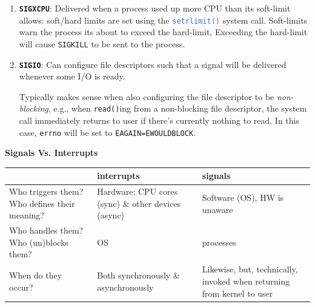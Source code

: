 \documentclass[openany,12pt]{book}
\newcommand{\code}[1]{\texttt{#1}}
\newcommand{\blue}[1]{\textcolor{RoyalBlue}{#1}}
\begin{document}
\begin{enumerate}
    \item \textbf{\code{SIGXCPU}}: Delivered when a process used up more CPU than its soft-limit allows: soft/hard limits are set using the \blue{\code{setrlimit()}} system call. Soft-limits warn the process its about to exceed the hard-limit, Exceeding the hard-limit will cause \code{SIGKILL} to be sent to the process.

    \item \textbf{\code{SIGIO}}: Can configure file descriptors such that a signal will be delivered whenever some I/O is ready.

          Typically makes sense when also configuring the file descriptor to be \textit{non-blocking}, e.g., when \code{read()}ing from a non-blocking file descriptor, the system call immediately returns to user if there's currently nothing to read. In this case, \code{errno} will be set to \code{EAGAIN=EWOULDBLOCK}.
\end{enumerate}


\begin{samepage}
    \begin{center}
        \textbf{Signals Vs. Interrupts}
        \begin{tabular}{|>{\raggedright\arraybackslash}p{4.5cm}|>{\raggedright\arraybackslash}p{5.5cm}|>{\raggedright\arraybackslash}p{5.5cm}|}
            \hline
            \rowcolor{blue!30}
             & \textbf{interrupts}                                                                      & \textbf{signals} \\
            \hline
            Who triggers them? \newline Who defines their meaning?
             & Hardware: \newline CPU cores (sync) \& other devices (async)
             & Software (OS), \newline HW is unaware                                                                       \\
            \hline
            Who handles them? \newline Who (un)blocks them?
             & OS
             & processes                                                                                                   \\
            \hline
            When do they occur?
             & Both synchronously \& asynchronously
             & Likewise, but, technically, \newline invoked when returning \newline from kernel to user                    \\
            \hline
        \end{tabular}
    \end{center}
\end{samepage}
\end{document}
